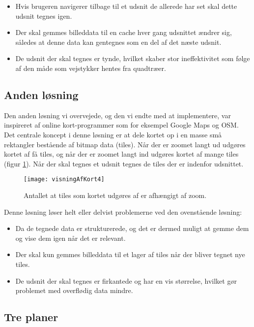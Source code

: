 \begin{itemize}
	\item Hvis brugeren navigerer tilbage til et udsnit de allerede har set skal dette udsnit tegnes igen.
	\item Der skal gemmes billeddata til en cache hver gang udsnittet ændrer sig, således at denne data kan gentegnes som en del af det næste udsnit.
	\item De udsnit der skal tegnes er tynde, hvilket skaber stor ineffektivitet som følge af den måde som vejstykker hentes fra quadtræer.
\end{itemize}

\subsection{Anden løsning}
\label{subsec:andenLoesning}

Den anden løsning vi overvejede, og den vi endte med at implementere, var inspireret af online kort-programmer som for eksempel Google Maps og OSM. Det centrale koncept i denne løsning er at dele kortet op i en masse små rektangler bestående af bitmap data (tiles). Når der er zoomet langt ud udgøres kortet af få tiles, og når der er zoomet langt ind udgøres kortet af mange tiles (figur \ref{figur:visningAfKort4}). Når der skal tegnes et udsnit tegnes de tiles der er indenfor udsnittet.

\begin{figure}[h]
	\centering
	\texttt{[image: visningAfKort4]}
	\captionsetup{width=0.8\textwidth}
	\caption{Antallet at tiles som kortet udgøres af er afhængigt af zoom.}
	\label{figur:visningAfKort4}
\end{figure}

Denne løsning løser helt eller delvist problemerne ved den ovenstående løsning:

\begin{itemize}
	\item Da de tegnede data er strukturerede, og det er dermed muligt at gemme dem og vise dem igen når det er relevant.
	\item Der skal kun gemmes billeddata til et lager af tiles når der bliver tegnet nye tiles.
	\item De udsnit der skal tegnes er firkantede og har en vis størrelse, hvilket gør problemet med overflødig data mindre.
\end{itemize}

\subsection{Tre planer}
\label{subsec:trePlaner}

